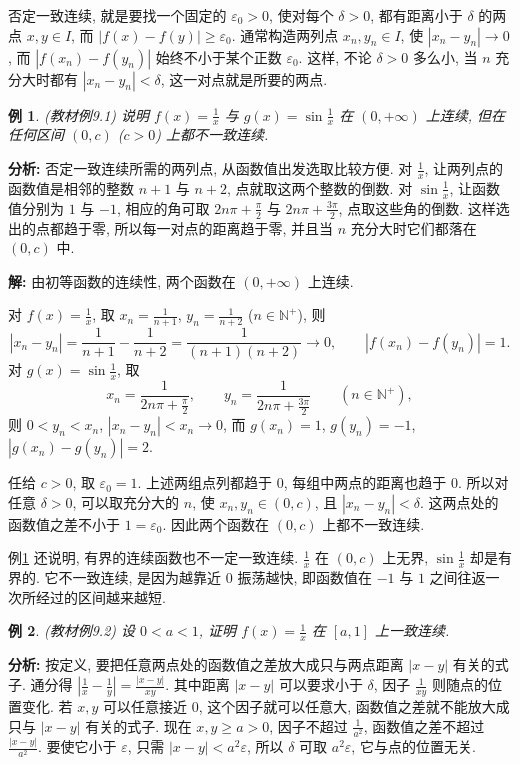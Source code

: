 \documentclass[UTF8,openany]{ctexbook}
\theoremstyle{chinesetextbook}
\newtheorem{example}{例}[section]
\newenvironment{cnsolution}{\par\indent\textbf{解:} \ignorespaces}{\par}
\begin{document}
否定一致连续, 就是要找一个固定的 $\varepsilon_0>0$, 使对每个 $\delta>0$, 都有距离小于 $\delta$ 的两点 $x,y\in I$, 而 $|f(x)-f(y)|\ge\varepsilon_0$. 通常构造两列点 $x_n,y_n\in I$, 使 $|x_n-y_n|\to0$, 而 $|f(x_n)-f(y_n)|$ 始终不小于某个正数 $\varepsilon_0$. 这样, 不论 $\delta>0$ 多么小, 当 $n$ 充分大时都有 $|x_n-y_n|<\delta$, 这一对点就是所要的两点.
\begin{example}\label{ex:9-1}
\textnormal{(教材例9.1)} 说明 $\displaystyle f(x)=\frac1x$ 与 $\displaystyle g(x)=\sin\frac1x$ 在 $(0,+\infty)$ 上连续, 但在任何区间 $(0,c)$ ($c>0$) 上都不一致连续.
\end{example}
\par\indent\textbf{分析:} 否定一致连续所需的两列点, 从函数值出发选取比较方便. 对 $\displaystyle\frac1x$, 让两列点的函数值是相邻的整数 $n+1$ 与 $n+2$, 点就取这两个整数的倒数. 对 $\displaystyle\sin\frac1x$, 让函数值分别为 $1$ 与 $-1$, 相应的角可取 $\displaystyle2n\pi+\frac\pi2$ 与 $\displaystyle2n\pi+\frac{3\pi}2$, 点取这些角的倒数. 这样选出的点都趋于零, 所以每一对点的距离趋于零, 并且当 $n$ 充分大时它们都落在 $(0,c)$ 中.
\begin{cnsolution}
由初等函数的连续性, 两个函数在 $(0,+\infty)$ 上连续.

对 $\displaystyle f(x)=\frac1x$, 取 $\displaystyle x_n=\frac1{n+1}$, $\displaystyle y_n=\frac1{n+2}$ ($n\in\mathbb N^+$), 则
\[
|x_n-y_n|=\frac1{n+1}-\frac1{n+2}=\frac1{(n+1)(n+2)}\to0,\qquad|f(x_n)-f(y_n)|=1.
\]
对 $\displaystyle g(x)=\sin\frac1x$, 取
\[
x_n=\frac1{2n\pi+\frac\pi2},\qquad y_n=\frac1{2n\pi+\frac{3\pi}2}\qquad(n\in\mathbb N^+),
\]
则 $0<y_n<x_n$, $|x_n-y_n|<x_n\to0$, 而 $g(x_n)=1$, $g(y_n)=-1$, $|g(x_n)-g(y_n)|=2$.

任给 $c>0$, 取 $\varepsilon_0=1$. 上述两组点列都趋于 $0$, 每组中两点的距离也趋于 $0$. 所以对任意 $\delta>0$, 可以取充分大的 $n$, 使 $x_n,y_n\in(0,c)$, 且 $|x_n-y_n|<\delta$. 这两点处的函数值之差不小于 $1=\varepsilon_0$. 因此两个函数在 $(0,c)$ 上都不一致连续.
\end{cnsolution}
例\ref{ex:9-1} 还说明, 有界的连续函数也不一定一致连续. $\displaystyle\frac1x$ 在 $(0,c)$ 上无界, $\displaystyle\sin\frac1x$ 却是有界的. 它不一致连续, 是因为越靠近 $0$ 振荡越快, 即函数值在 $-1$ 与 $1$ 之间往返一次所经过的区间越来越短.
\begin{example}
\textnormal{(教材例9.2)} 设 $0<a<1$, 证明 $\displaystyle f(x)=\frac1x$ 在 $[a,1]$ 上一致连续.
\end{example}
\par\indent\textbf{分析:} 按定义, 要把任意两点处的函数值之差放大成只与两点距离 $|x-y|$ 有关的式子. 通分得 $\displaystyle\left|\frac1x-\frac1y\right|=\frac{|x-y|}{xy}$. 其中距离 $|x-y|$ 可以要求小于 $\delta$, 因子 $\displaystyle\frac1{xy}$ 则随点的位置变化. 若 $x,y$ 可以任意接近 $0$, 这个因子就可以任意大, 函数值之差就不能放大成只与 $|x-y|$ 有关的式子. 现在 $x,y\ge a>0$, 因子不超过 $\displaystyle\frac1{a^2}$, 函数值之差不超过 $\displaystyle\frac{|x-y|}{a^2}$. 要使它小于 $\varepsilon$, 只需 $|x-y|<a^2\varepsilon$, 所以 $\delta$ 可取 $a^2\varepsilon$, 它与点的位置无关.
\end{document}
